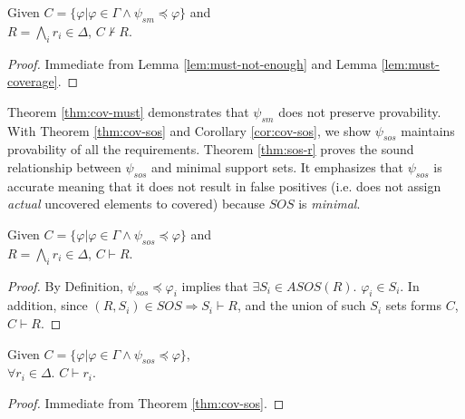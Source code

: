 \begin{theorem}
\label{thm:cov-must}
Given $C = \{\varphi | \varphi \in \Gamma \wedge \psi_{sm} \preccurlyeq \varphi \}$
and \\ $R = \bigwedge_{i} {r_i \in \Delta}$, $C \nvdash R$.
\end{theorem}
\begin{proof}
Immediate from Lemma \ref{lem:must-not-enough} and Lemma \ref{lem:must-coverage}.
\end{proof}
\vspace{2mm}
Theorem \ref{thm:cov-must} demonstrates that $\psi_{sm}$ does not preserve provability.
With Theorem \ref{thm:cov-sos} and Corollary \ref{cor:cov-sos},
we show $\psi_{sos}$ maintains provability of all the requirements.
Theorem \ref{thm:sos-r} proves the sound relationship
between $\psi_{sos}$ and minimal support sets.
It emphasizes that $\psi_{sos}$ is accurate meaning that it does not result in false positives
(i.e. does not assign \emph{actual} uncovered elements to covered) because $SOS$ is \emph{minimal}.

\begin{theorem}
\label{thm:cov-sos}
Given $C = \{\varphi | \varphi \in \Gamma \wedge  \psi_{sos} \preccurlyeq \varphi \}$
and \\ $R = \bigwedge_{i} {r_i \in \Delta}$, $C \vdash R$.
\end{theorem}
\begin{proof}
By Definition, $\psi_{sos} \preccurlyeq \varphi_i$ implies that $\exists S_i \in ASOS(R)$. $\varphi_i \in S_i$.
In addition, since $(R, S_i) \in SOS \Rightarrow S_i \vdash R$, and the union of such $S_i$ sets
forms $C$,
$C \vdash R$.
\end{proof}
\vspace{2mm}

\begin{coroll}
\label{cor:cov-sos}
Given $C = \{\varphi | \varphi \in \Gamma \wedge  \psi_{sos} \preccurlyeq \varphi \}$, \\
$\forall r_i \in \Delta$. $C \vdash r_i$.
\end{coroll}
\begin{proof}
Immediate from Theorem \ref{thm:cov-sos}.
\end{proof}
\vspace{2mm}

